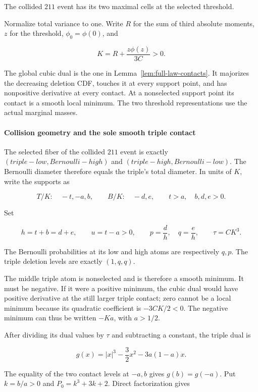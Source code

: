 The collided $211$ event has its two maximal cells at the selected threshold.

Normalize total variance to one. Write $R$ for the sum of third absolute moments,
$z$ for the threshold, $\phi_0=\phi(0)$, and

\[
 K=R+\frac{z\phi(z)}{3C}>0.
\tag{B.14.1}\label{contact:one-triple-bernoulli-collision-211-1}
\]

The global cubic dual is the one in
Lemma~\ref{lem:full-law-contacts}.
It majorizes the decreasing deletion CDF, touches it at every support
point, and has nonpositive derivative at every contact. At a nonselected
support point its contact is a smooth local minimum. The two threshold representations use the actual marginal masses.

\paragraph{Collision geometry and the sole smooth triple contact}

The selected fiber of the collided $211$ event is exactly
$(triple-low, Bernoulli-high)$ and $(triple-high, Bernoulli-low)$.
The Bernoulli diameter therefore equals the triple's total diameter.
In units of $K$, write the supports as

\[
 T/K:\quad -t,-a,b,\qquad B/K:\quad -d,e,
 \qquad t>a,\quad b,d,e>0.
\]

Set

\[
 h=t+b=d+e,\qquad u=t-a>0,\qquad
 p=\frac d h,\quad q=\frac e h,\qquad \tau=CK^3.
\tag{B.14.2}\label{contact:one-triple-bernoulli-collision-211-2}
\]

The Bernoulli probabilities at its low and high atoms are respectively
$q,p$. The triple deletion levels are exactly $(1,q,q)$.

The middle triple atom is nonselected and is therefore a smooth minimum.
It must be negative. If it were a positive minimum, the cubic dual would
have positive derivative at the still larger triple contact; zero cannot
be a local minimum because its quadratic coefficient is $-3CK/2<0$.
The negative minimum can thus be written $-Ka$, with $a>1/2$.

After dividing its dual values by $\tau$ and subtracting a constant, the
triple dual is

\[
 g(x)=|x|^3-\frac32x^2-3a(1-a)x.
\tag{B.14.3}\label{contact:one-triple-bernoulli-collision-211-3}
\]

The equality of the two contact levels at $-a,b$ gives $g(b)=g(-a)$.
Put $k=b/a>0$ and $P_0=k^3+3k+2$. Direct factorization gives


